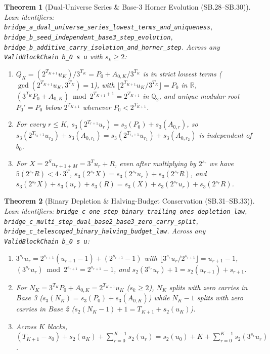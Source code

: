 \documentclass[11pt]{article}
\newtheorem{theorem}{Theorem}[section]
\begin{document}
\begin{theorem}[Dual-Universe Series \& Base-3 Horner Evolution (SB.28--SB.30)]
\emph{Lean identifiers:} \nolinkurl{bridge_a_dual_universe_series_lowest_terms_and_uniqueness}, \nolinkurl{bridge_b_seed_independent_base3_step_evolution}, \nolinkurl{bridge_b_additive_carry_isolation_and_horner_step}.
Across any \texttt{ValidBlockChain b\_0 s u} with $s_k \ge 2$:
\begin{enumerate}
  \item $Q_K = (2^{T_{K+1}} u_K) / 3^{T_K} = P_0 + A_{0,K}/3^{T_K}$ is in strict lowest terms ($\gcd(2^{T_{K+1}} u_K, 3^{T_K}) = 1$), with $\lfloor 2^{T_{K+1}} u_K / 3^{T_K} \rfloor = P_0$ in $\mathbb{R}$, $(3^{T_K} P_0 + A_{0,K}) \bmod 2^{T_{K+1}+1} = 2^{T_{K+1}}$ in $\mathbb{Q}_2$, and unique modular root $P_0' = P_0$ below $2^{T_{K+1}}$ whenever $P_0 < 2^{T_{K+1}}$.
  \item For every $r \le K$, $s_3(2^{T_{r+1}} u_r) = s_3(P_0) + s_3(A_{0,r})$, so $s_3(2^{T_{r_2+1}} u_{r_2}) + s_3(A_{0,r_1}) = s_3(2^{T_{r_1+1}} u_{r_1}) + s_3(A_{0,r_2})$ is independent of $b_0$.
  \item For $X = 2^S u_{r+1+M} = 3^T u_r + R$, even after multiplying by $2^{s_r}$ we have $5(2^{s_r} R) < 4 \cdot 3^T$, $s_3(2^{s_r} X) = s_3(2^{s_r} u_r) + s_3(2^{s_r} R)$, and $s_3(2^{s_r} X) + s_3(u_r) + s_3(R) = s_3(X) + s_3(2^{s_r} u_r) + s_3(2^{s_r} R)$.
\end{enumerate}
\end{theorem}

\begin{theorem}[Binary Depletion \& Halving-Budget Conservation (SB.31--SB.33)]
\emph{Lean identifiers:} \nolinkurl{bridge_c_one_step_binary_trailing_ones_depletion_law}, \nolinkurl{bridge_c_multi_step_dual_base2_base3_zero_carry_split}, \nolinkurl{bridge_c_telescoped_binary_halving_budget_law}.
Across any \texttt{ValidBlockChain b\_0 s u}:
\begin{enumerate}
  \item $3^{s_r} u_r = 2^{s_{r+1}}(u_{r+1} - 1) + (2^{s_{r+1}} - 1)$ with $\lfloor 3^{s_r} u_r / 2^{s_{r+1}} \rfloor = u_{r+1} - 1$, $(3^{s_r} u_r) \bmod 2^{s_{r+1}} = 2^{s_{r+1}} - 1$, and $s_2(3^{s_r} u_r) + 1 = s_2(u_{r+1}) + s_{r+1}$.
  \item For $N_K = 3^{T_K} P_0 + A_{0,K} = 2^{T_{K+1}} u_K$ ($s_k \ge 2$), $N_K$ splits with zero carries in Base 3 ($s_3(N_K) = s_3(P_0) + s_3(A_{0,K})$) while $N_K - 1$ splits with zero carries in Base 2 ($s_2(N_K - 1) + 1 = T_{K+1} + s_2(u_K)$).
  \item Across $K$ blocks, $(T_{K+1} - s_0) + s_2(u_K) + \sum_{r=0}^{K-1} s_2(u_r) = s_2(u_0) + K + \sum_{r=0}^{K-1} s_2(3^{s_r} u_r)$.
\end{enumerate}
\end{theorem}
\end{document}
